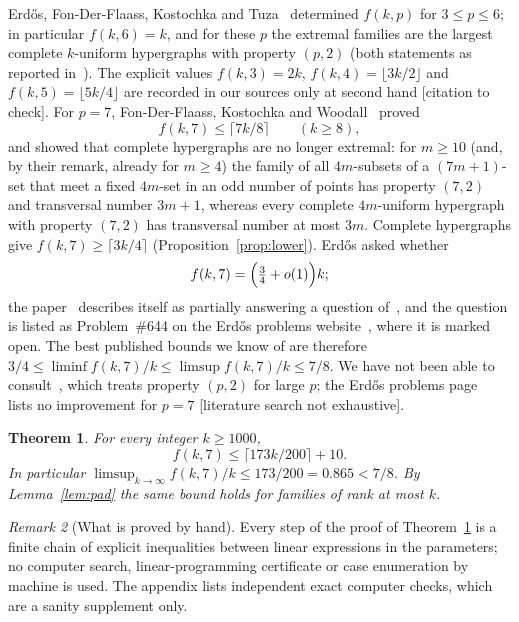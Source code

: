 \documentclass[11pt]{amsart}
\newtheorem{theorem}{Theorem}[section]
\theoremstyle{definition}
\theoremstyle{remark}
\newtheorem{remark}[theorem]{Remark}
\newcommand{\ceil}[1]{\lceil #1\rceil}
\newcommand{\floor}[1]{\lfloor #1\rfloor}
\begin{document}
Erd\H{o}s, Fon-Der-Flaass, Kostochka and Tuza~\cite{EFKT} determined $f(k,p)$ for $3\le p\le6$; in particular $f(k,6)=k$, and for these $p$ the extremal families are the largest complete $k$-uniform hypergraphs with property $(p,2)$ (both statements as reported in~\cite{FKW}). The explicit values $f(k,3)=2k$, $f(k,4)=\floor{3k/2}$ and $f(k,5)=\floor{5k/4}$ are recorded in our sources only at second hand [citation to check]. For $p=7$, Fon-Der-Flaass, Kostochka and Woodall~\cite{FKW} proved
\[
f(k,7)\le\ceil{7k/8}\qquad(k\ge8),
\]
and showed that complete hypergraphs are no longer extremal: for $m\ge10$ (and, by their remark, already for $m\ge4$) the family of all $4m$-subsets of a $(7m+1)$-set that meet a fixed $4m$-set in an odd number of points has property $(7,2)$ and transversal number $3m+1$, whereas every complete $4m$-uniform hypergraph with property $(7,2)$ has transversal number at most $3m$. Complete hypergraphs give $f(k,7)\ge\ceil{3k/4}$ (Proposition~\ref{prop:lower}). Erd\H{o}s asked whether
\[
f(k,7)=\Bigl(\tfrac34+o(1)\Bigr)k ;
\]
the paper~\cite{FKW} describes itself as partially answering a question of~\cite{EFKT}, and the question is listed as Problem~\#644 on the Erd\H{o}s problems website~\cite{EP}, where it is marked open. The best published bounds we know of are therefore $3/4\le\liminf f(k,7)/k\le\limsup f(k,7)/k\le7/8$. We have not been able to consult~\cite{Kos}, which treats property $(p,2)$ for large $p$; the Erd\H{o}s problems page~\cite{EP} lists no improvement for $p=7$ [literature search not exhaustive].

\begin{theorem}\label{thm:main}
For every integer $k\ge1000$,
\[
f(k,7)\le\ceil{173k/200}+10 .
\]
In particular $\limsup_{k\to\infty}f(k,7)/k\le173/200=0.865<7/8$. By Lemma~\ref{lem:pad} the same bound holds for families of rank at most $k$.
\end{theorem}

\begin{remark}[What is proved by hand]
Every step of the proof of Theorem~\ref{thm:main} is a finite chain of explicit inequalities between linear expressions in the parameters; no computer search, linear-programming certificate or case enumeration by machine is used. The appendix lists independent exact computer checks, which are a sanity supplement only.
\end{remark}
\end{document}
